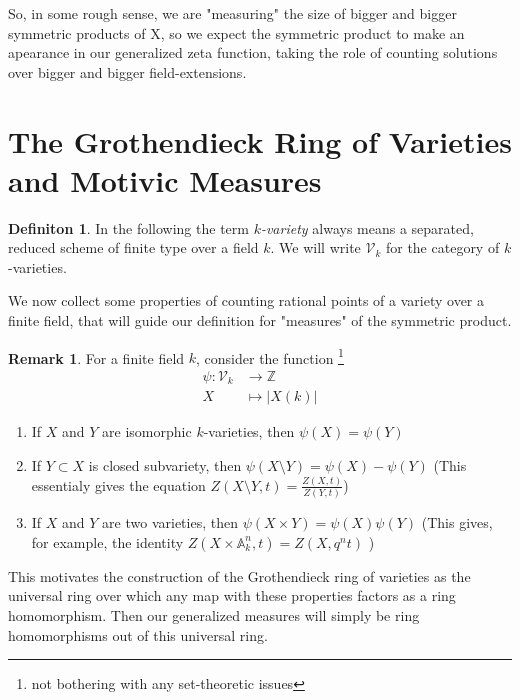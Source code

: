 \documentclass[11pt, a4paper, german]{article}
\theoremstyle{plain}
\theoremstyle{definition}
\newtheorem{definition}[theorem]{Definiton}
\newtheorem{remark}[theorem]{Remark}
\begin{document}
So, in some rough sense, we are "measuring" the size of bigger and bigger symmetric products of X, so we expect the symmetric product
to make an apearance in our generalized zeta function, taking the role of counting solutions over bigger and bigger field-extensions.


\section{The Grothendieck Ring of Varieties and Motivic Measures}

\begin{definition}
    In the following the term \emph{$k$-variety} always means a separated, reduced scheme of finite type over a field $k$.
    We will write $\mathcal{V}_k$ for the category of $k$-varieties.
\end{definition}

We now collect some properties of counting rational points of a variety over a finite field, that will guide our definition for "measures" 
of the symmetric product.

\begin{remark}
    For a finite field $k$, consider the function \footnote{not bothering with any set-theoretic issues} 
    \begin{align*}
        \psi: \mathcal{V}_k & \to   \mathbb{Z}\\
        X & \mapsto |X(k)|
    \end{align*}
    \begin{enumerate}
        \item If $X$ and $Y$ are isomorphic $k$-varieties, then $\psi(X) = \psi(Y)$
        \item If $Y \subset X$ is closed subvariety, then $\psi(X \setminus Y) = \psi(X) - \psi(Y)$ 
              (This essentialy gives the equation $Z(X \setminus Y, t) = \frac{Z(X, t)}{Z(Y,t)}$)
        \item If $X$ and $Y$ are two varieties, then $\psi(X \times Y) = \psi(X)\psi(Y)$
              (This gives, for example, the identity $Z(X \times \mathbb{A}^n_k, t) = Z(X, q^nt)$ )
    \end{enumerate}
\end{remark}


This motivates the construction of the Grothendieck ring of varieties as the universal ring over which any map with these properties factors as a 
ring homomorphism. Then our generalized measures will simply be ring homomorphisms out of this universal ring.
\end{document}
